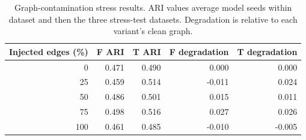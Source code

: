 \begin{table}[t]
\centering
\scriptsize
\setlength{\tabcolsep}{2.5pt}
\caption{Graph-contamination stress results. ARI values average model seeds within dataset and then the three stress-test datasets. Degradation is relative to each variant's clean graph.}
\label{tab:stress_overall}
\begin{tabular}{rrrrr}
\toprule
Injected edges (\%) & F ARI & T ARI & F degradation & T degradation \\ 
\midrule
0 & 0.471 & 0.490 & 0.000 & 0.000 \\
25 & 0.459 & 0.514 & -0.011 & 0.024 \\
50 & 0.486 & 0.501 & 0.015 & 0.011 \\
75 & 0.498 & 0.516 & 0.027 & 0.026 \\
100 & 0.461 & 0.485 & -0.010 & -0.005 \\
\bottomrule
\end{tabular}
\end{table}
